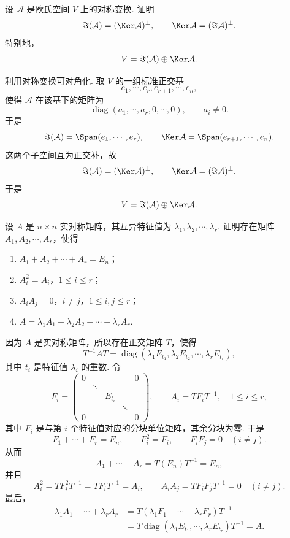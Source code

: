 \begin{problem}
	设 $\mathcal A$ 是欧氏空间 $V$ 上的对称变换. 证明
	\[
	\Im(\mathcal A)=(\Ker\mathcal A)^\perp,
	\qquad
	\Ker\mathcal A=(\Im \mathcal A)^\perp.
	\]
	特别地，
	\[
	V=\Im(\mathcal A)\oplus\Ker\mathcal A.
	\]
\end{problem}
\begin{solution}
	利用对称变换可对角化. 取 $V$ 的一组标准正交基
	\[
	e_1,\cdots,e_r,e_{r+1},\cdots,e_n,
	\]
	使得 $\mathcal A$ 在该基下的矩阵为
	\[
	\operatorname{diag}(a_1,\cdots,a_r,0,\cdots,0),
	\qquad a_i\ne0.
	\]
	于是
	\[
	\Im(\mathcal A)=\Span(e_1,\cdots,e_r),
	\qquad
	\Ker\mathcal A=\Span(e_{r+1},\cdots,e_n).
	\]
	这两个子空间互为正交补，故
	\[
	\Im(\mathcal A)=(\Ker\mathcal A)^\perp,
	\qquad
	\Ker\mathcal A=(\Im \mathcal A)^\perp.
	\]
	于是
	\[
	V=\Im(\mathcal A)\oplus\Ker\mathcal A.
	\]
\end{solution}

\begin{problem}
	设 $A$ 是 $n\times n$ 实对称矩阵，其互异特征值为 $\lambda_1,\lambda_2,\cdots,\lambda_r$. 证明存在矩阵 $A_1,A_2,\cdots,A_r$，使得
	\begin{enumerate}
		\item $A_1+A_2+\cdots+A_r=E_n$；
		\item $A_i^2=A_i$，$1\leqslant i\leqslant r$；
		\item $A_iA_j=0$，$i\ne j$，$1\leqslant i,j\leqslant r$；
		\item $A=\lambda_1A_1+\lambda_2A_2+\cdots+\lambda_rA_r$.
	\end{enumerate}
\end{problem}
\begin{solution}
	因为 $A$ 是实对称矩阵，所以存在正交矩阵 $T$，使得
	\[
	T^{-1}AT=\operatorname{diag}(\lambda_1E_{t_1},\lambda_2E_{t_2},\cdots,\lambda_rE_{t_r}),
	\]
	其中 $t_i$ 是特征值 $\lambda_i$ 的重数. 令
	\[
	F_i=
	\begin{pmatrix}
		0 &        &        &        & 0\\
		& \ddots &        &        &  \\
		&        & E_{t_i}&        &  \\
		&        &        & \ddots &  \\
		0 &        &        &        & 0
	\end{pmatrix},
	\qquad
	A_i=TF_iT^{-1},
	\quad 1\leqslant i\leqslant r,
	\]
	其中 $F_i$ 是与第 $i$ 个特征值对应的分块单位矩阵，其余分块为零. 于是
	\[
	F_1+\cdots+F_r=E_n,
	\qquad F_i^2=F_i,
	\qquad F_iF_j=0\quad(i\ne j).
	\]
	从而
	\[
	A_1+\cdots+A_r=T(E_n)T^{-1}=E_n,
	\]
	并且
	\[
	A_i^2=TF_i^2T^{-1}=TF_iT^{-1}=A_i,
	\qquad
	A_iA_j=TF_iF_jT^{-1}=0\quad(i\ne j).
	\]
	最后，
	\[
	\begin{aligned}
		\lambda_1A_1+\cdots+\lambda_rA_r
		&=T(\lambda_1F_1+\cdots+\lambda_rF_r)T^{-1} \\
		&=T\operatorname{diag}(\lambda_1E_{t_1},\cdots,\lambda_rE_{t_r})T^{-1}=A.
	\end{aligned}
	\]
\end{solution}
